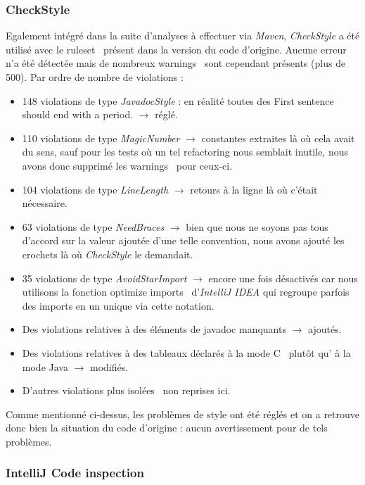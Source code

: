 \documentclass[12pt, openany]{report}
\begin{document}
\subsubsection*{CheckStyle}
Egalement intégré dans la suite d'analyses à effectuer via \textit{Maven}, \textit{CheckStyle} a été utilisé avec le \og ruleset \fg \, présent dans la version du code d'origine.
Aucune erreur n'a été détectée mais de nombreux \og warnings \fg \, sont cependant présents (plus de 500). Par ordre de nombre de \og violations \fg :
\begin{itemize}
	\item 148 violations de type \textit{JavadocStyle} : en réalité toutes des \og First sentence should end with a period. \fg $\rightarrow$ réglé. 
	\item 110 violations de type \textit{MagicNumber} $\rightarrow$ constantes extraites là où cela avait du sens, sauf pour les tests où un tel refactoring nous semblait inutile, nous avons donc supprimé les \og warnings \fg \, pour ceux-ci.
	\item 104 violations de type \textit{LineLength} $\rightarrow$ retours à la ligne là où c'était nécessaire.
	\item 63 violations de type \textit{NeedBraces} $\rightarrow$ bien que nous ne soyons pas tous d'accord sur la valeur ajoutée d'une telle convention, nous avons ajouté les crochets là où \textit{CheckStyle} le demandait.
	\item 35 violations de type \textit{AvoidStarImport} $\rightarrow$ encore une fois désactivés car nous utilisons la fonction \og optimize imports \fg \, d'\textit{IntelliJ IDEA} qui regroupe parfois des imports en un unique via cette notation.
	\item Des violations relatives à des éléments de javadoc manquants $\rightarrow$ ajoutés.
	\item Des violations relatives à des tableaux déclarés à la \og mode C \fg \, plutôt qu' à la \og mode Java \fg $\rightarrow$ modifiés.
	\item D'autres violations plus \og isolées \fg \, non reprises ici.
\end{itemize}
Comme mentionné ci-dessus, les problèmes de style ont été réglés et on a retrouve donc bien la situation du code d'origine : aucun avertissement pour de tels problèmes.

\subsubsection*{IntelliJ Code inspection}
\end{document}

